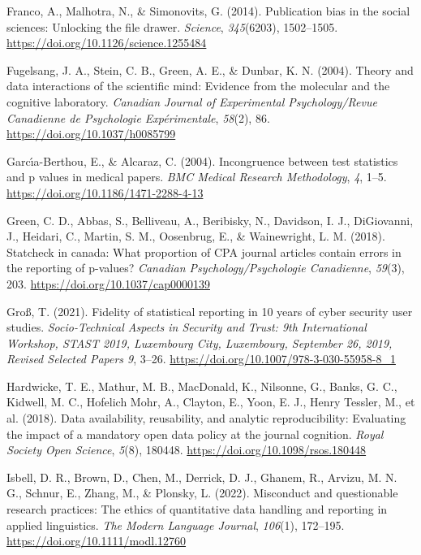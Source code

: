 \documentclass[
  doc,
  longtable,
  nolmodern,
  notxfonts,
  notimes,
  colorlinks=true,linkcolor=blue,citecolor=blue,urlcolor=blue]{apa7}
\newlength{\cslhangindent}
\newenvironment{CSLReferences}[2] %
 {\begin{list}{}{%
  \setlength{\itemindent}{0pt}
  \setlength{\leftmargin}{0pt}
  \setlength{\parsep}{0pt}
  \ifodd #1
   \setlength{\leftmargin}{\cslhangindent}
   \setlength{\itemindent}{-1\cslhangindent}
  \fi
  \setlength{\itemsep}{#2\baselineskip}}}
 {\end{list}}
\begin{document}
\begin{CSLReferences}{1}{0}
Franco, A., Malhotra, N., \& Simonovits, G. (2014). Publication bias in
the social sciences: Unlocking the file drawer. \emph{Science},
\emph{345}(6203), 1502--1505.
\url{https://doi.org/10.1126/science.1255484}

Fugelsang, J. A., Stein, C. B., Green, A. E., \& Dunbar, K. N. (2004).
Theory and data interactions of the scientific mind: Evidence from the
molecular and the cognitive laboratory. \emph{Canadian Journal of
Experimental Psychology/Revue Canadienne de Psychologie
Exp{é}rimentale}, \emph{58}(2), 86.
\url{https://doi.org/10.1037/h0085799}

Garcı́a-Berthou, E., \& Alcaraz, C. (2004). Incongruence between test
statistics and p values in medical papers. \emph{BMC Medical Research
Methodology}, \emph{4}, 1--5.
\url{https://doi.org/10.1186/1471-2288-4-13}

Green, C. D., Abbas, S., Belliveau, A., Beribisky, N., Davidson, I. J.,
DiGiovanni, J., Heidari, C., Martin, S. M., Oosenbrug, E., \&
Wainewright, L. M. (2018). Statcheck in canada: What proportion of CPA
journal articles contain errors in the reporting of p-values?
\emph{Canadian Psychology/Psychologie Canadienne}, \emph{59}(3), 203.
\url{https://doi.org/10.1037/cap0000139}

Groß, T. (2021). Fidelity of statistical reporting in 10 years of cyber
security user studies. \emph{Socio-Technical Aspects in Security and
Trust: 9th International Workshop, STAST 2019, Luxembourg City,
Luxembourg, September 26, 2019, Revised Selected Papers 9}, 3--26.
\url{https://doi.org/10.1007/978-3-030-55958-8_1}

Hardwicke, T. E., Mathur, M. B., MacDonald, K., Nilsonne, G., Banks, G.
C., Kidwell, M. C., Hofelich Mohr, A., Clayton, E., Yoon, E. J., Henry
Tessler, M., et al. (2018). Data availability, reusability, and analytic
reproducibility: Evaluating the impact of a mandatory open data policy
at the journal cognition. \emph{Royal Society Open Science},
\emph{5}(8), 180448. \url{https://doi.org/10.1098/rsos.180448}

Isbell, D. R., Brown, D., Chen, M., Derrick, D. J., Ghanem, R., Arvizu,
M. N. G., Schnur, E., Zhang, M., \& Plonsky, L. (2022). Misconduct and
questionable research practices: The ethics of quantitative data
handling and reporting in applied linguistics. \emph{The Modern Language
Journal}, \emph{106}(1), 172--195.
\url{https://doi.org/10.1111/modl.12760}


\end{CSLReferences}
\end{document}

